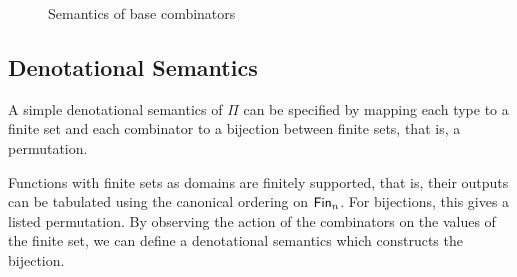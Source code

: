 \begin{figure}[t]
{}
\caption{Semantics of base combinators}\label{fig:delta}
\end{figure}

\subsection{Denotational Semantics}

\noindent A simple denotational semantics of $\Pi$ can be specified by mapping each type to a finite set and each
combinator to a bijection between finite sets, that is, a permutation.

Functions with finite sets as domains are finitely supported, that is, their outputs can be tabulated using the
canonical ordering on $\Fin[n]$. For bijections, this gives a listed permutation. By observing the action of the
combinators on the values of the finite set, we can define a denotational semantics which constructs the bijection.

